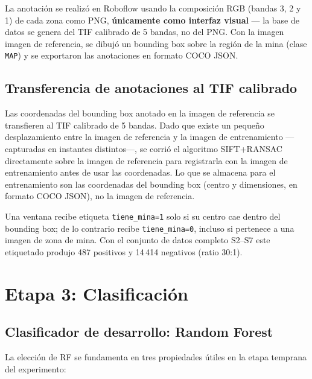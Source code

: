 La anotación se realizó en Roboflow usando la composición RGB (bandas 3, 2
y 1) de cada zona como PNG, \textbf{únicamente como interfaz visual} --- la
base de datos se genera del TIF calibrado de 5 bandas, no del PNG. Con la imagen
imagen de referencia, se dibujó un bounding box sobre la región de la mina (clase
\texttt{MAP}) y se exportaron las anotaciones en formato COCO JSON.

\subsection{Transferencia de anotaciones al TIF calibrado}

Las coordenadas del bounding box anotado en la imagen de referencia se
transfieren al TIF calibrado de 5 bandas. Dado que existe un pequeño
desplazamiento entre la imagen de referencia y la imagen de entrenamiento
---capturadas en instantes distintos---, se corrió el algoritmo
\ac{SIFT}+RANSAC directamente sobre la imagen de referencia para registrarla
con la imagen de entrenamiento antes de usar las coordenadas. Lo que se almacena
para el entrenamiento son las coordenadas del bounding box (centro y dimensiones,
en formato COCO JSON), no la imagen de referencia.

Una ventana recibe etiqueta \texttt{tiene\_mina=1} solo si su centro cae dentro
del bounding box; de lo contrario recibe \texttt{tiene\_mina=0}, incluso si
pertenece a una imagen de zona de mina. Con el conjunto de datos completo S2--S7
este etiquetado produjo 487 positivos y 14\,414 negativos (ratio 30:1).


\section{Etapa 3: Clasificación}

\subsection{Clasificador de desarrollo: Random Forest}
\label{sec:clasificador_rf}

La elección de \ac{RF} se fundamenta en tres propiedades útiles en la etapa
temprana del experimento:

